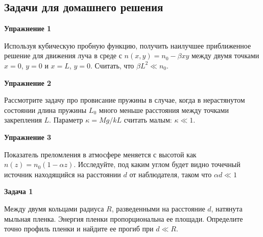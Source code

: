 \documentclass[a4paper,12pt]{article}
\begin{document}
\subsection*{Задачи для домашнего решения}

\noindent \textbf{Упражнение 1}

\noindent Используя кубическую пробную функцию, получить наилучшее приближенное решение для движения луча в среде с $n(x,y)=n_0 - \beta x y$ между двумя точками $x=0$, $y=0$ и $x=L$, $y=0$. Считать, что $\beta L^2\ll n_0$.

\vspace{15pt}
\noindent \textbf{Упражнение 2}

\noindent Рассмотрите задачу про провисание пружины в случае, когда в нерастянутом состоянии длина пружины $L_0$ много меньше расстояния между точками закрепления $L$. Параметр $\kappa = Mg/kL$ считать малым: $\kappa\ll 1$.

\vspace{15pt}
\noindent \textbf{Упражнение 3}

\noindent Показатель преломления в атмосфере меняется с высотой как $n(z)=n_0(1-\alpha z)$. Исследуйте, под каким углом будет видно точечный источник находящийся на расстоянии $d$ от наблюдателя, таком что $\alpha d\ll 1$

\vspace{15pt}
\noindent \textbf{Задача 1}

\noindent Между двумя кольцами радиуса $R$, разведенными на расстояние $d$, натянута мыльная пленка. Энергия пленки пропорциональна ее площади. Определите точно профиль пленки и найдите ее прогиб при $d\ll R$.
\end{document}
